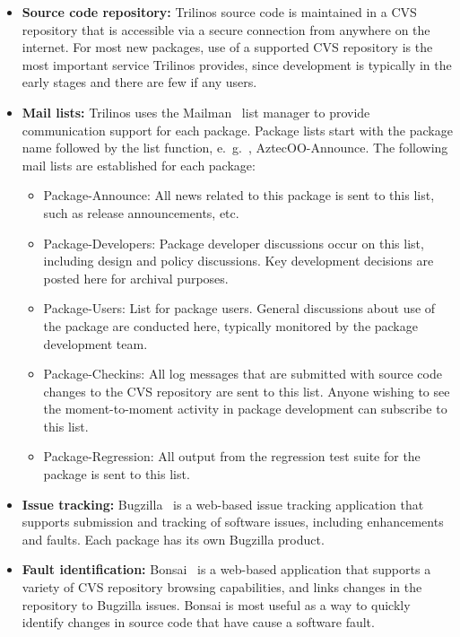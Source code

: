 \documentclass[12pt,relax]{TPA}
\begin{document}
\begin{itemize}
\item {\bf Source code repository:}
Trilinos source code is
maintained in a CVS~\cite{CVS} repository that is accessible via a
secure connection from anywhere on the internet.  For most new
packages, use of a supported CVS repository is the most important
service Trilinos provides, since development is typically in the early
stages and there are few if any users.

\item {\bf Mail lists:}
Trilinos uses the Mailman~\cite{Mailman} list manager to provide
communication support for each package.  Package lists start with the
package name followed by the list function, e.~g.~, AztecOO-Announce.
The
following mail lists are established for each package:
\begin{itemize}
\item Package-Announce: All news related to this package is sent to
this list, such as release announcements, etc.
\item Package-Developers: Package developer discussions occur on this list,
including design and policy discussions.  Key development decisions are posted
here for archival purposes.
\item Package-Users: List for package users. General discussions about
use of the package are conducted here, typically monitored by the
package development team.
\item Package-Checkins: All log messages that are submitted with
source code changes to the CVS repository are sent to this list.
Anyone wishing to see the moment-to-moment activity in package
development can subscribe to this list.
\item Package-Regression: All output from the regression test suite
for the package is sent to this list.
\end{itemize}

\item {\bf Issue tracking:}
Bugzilla~\cite{Bugzilla} is a web-based issue tracking
application that supports submission and tracking of software issues,
including enhancements and faults.  Each package has its own Bugzilla
product.

\item {\bf Fault identification:}
Bonsai~\cite{Bonsai} is a web-based application that supports a
variety of CVS repository browsing capabilities, and links changes in the
repository to Bugzilla issues. Bonsai is most useful as a way to
quickly identify changes in source code that have cause a software
fault.


\end{itemize}
\end{document}

